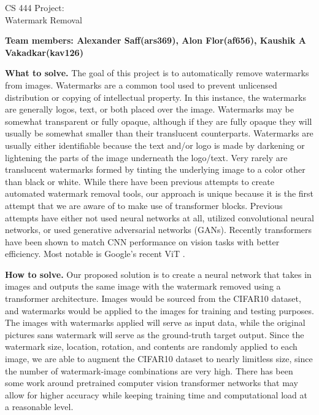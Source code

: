 \documentclass[11pt]{article}
\begin{document}
\begin{center}
\large{CS 444 Project:\\Watermark Removal}\\
\end{center}
\vspace{5mm}

\textbf{Team members: Alexander Saff(ars369), Alon Flor(af656), Kaushik A Vakadkar(kav126)}




\begin{sloppypar}
\textbf{What to solve.}
The goal of this project is to automatically remove watermarks from images. Watermarks are a common tool used to prevent unlicensed distribution or copying of intellectual property. In this instance, the watermarks are generally logos, text, or both placed over the image. Watermarks may be somewhat transparent or fully opaque, although if they are fully opaque they will usually be somewhat smaller than their translucent counterparts. Watermarks are usually either identifiable because the text and/or logo is made by darkening or lightening the parts of the image underneath the logo/text. Very rarely are translucent watermarks formed by tinting the underlying image to a color other than black or white. While there have been previous attempts to create automated watermark removal tools, our approach is unique because it is the first attempt that we are aware of to make use of transformer blocks. Previous attempts have either not used neural networks at all, utilized convolutional neural networks, or used generative adversarial networks (GANs). Recently transformers have been shown to match CNN performance on vision tasks with better efficiency. Most notable is Google’s recent ViT \cite{dosovitskiy2020image}.
\end{sloppypar}

\begin{sloppypar}
\textbf{How to solve.} 
Our proposed solution is to create a neural network that takes in images and outputs the same image with the watermark removed using a transformer architecture. Images would be sourced from the CIFAR10 dataset, and watermarks would be applied to the images for training and testing purposes. The images with watermarks applied will serve as input data, while the original pictures sans watermark will serve as the ground-truth target output. Since the watermark size, location, rotation, and contents are randomly applied to each image, we are able to augment the CIFAR10 dataset to nearly limitless size, since the number of watermark-image combinations are very high. There has been some work around pretrained computer vision transformer networks that may allow for higher accuracy while keeping training time and computational load at a reasonable level.
\end{sloppypar}
\end{document}
